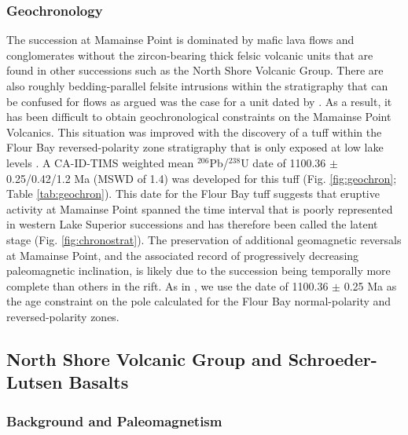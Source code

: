 \documentclass[11pt,letterpaper]{article}
\begin{document}
\subsubsection{Geochronology}

The succession at Mamainse Point is dominated by mafic lava flows and conglomerates without the zircon-bearing thick felsic volcanic units that are found in other successions such as the North Shore Volcanic Group. There are also roughly bedding-parallel felsite intrusions within the stratigraphy \citep{Giblin1969a, Swanson-Hysell2014a} that can be confused for flows as \cite{Swanson-Hysell2014a} argued was the case for a unit dated by \cite{Davis1995a}. As a result, it has been difficult to obtain geochronological constraints on the Mamainse Point Volcanics. This situation was improved with the discovery of a tuff within the Flour Bay reversed-polarity zone stratigraphy that is only exposed at low lake levels \citep{Swanson-Hysell2014a}. A CA-ID-TIMS weighted mean $^{206}$Pb/$^{238}$U date of 1100.36 $\pm$ 0.25/0.42/1.2 Ma (MSWD of 1.4) was developed for this tuff (Fig. \ref{fig:geochron}; Table \ref{tab:geochron}). This date for the Flour Bay tuff suggests that eruptive activity at Mamainse Point spanned the time interval that is poorly represented in western Lake Superior successions and has therefore been called the latent stage (Fig. \ref{fig:chronostrat}). The preservation of additional geomagnetic reversals at Mamainse Point, and the associated record of progressively decreasing paleomagnetic inclination, is likely due to the succession being temporally more complete than others in the rift. As in \cite{Swanson-Hysell2014a}, we use the date of 1100.36 $\pm$ 0.25 Ma as the age constraint on the pole calculated for the Flour Bay normal-polarity and reversed-polarity zones.

\subsection{North Shore Volcanic Group and Schroeder-Lutsen Basalts}

\subsubsection{Background and Paleomagnetism}
\end{document}
